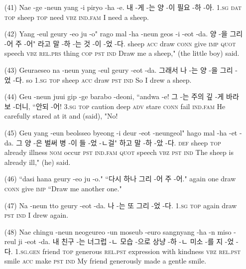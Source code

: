 \begin{itemize}
\item [(41)]
\tgl
		{Nae -ge -neun yang -i piryo -ha -e.}
		{내 -게 -는 양 -이 필요 -하 -아.}
		{\textsc{1.sg}	\textsc{dat}	\textsc{top}	sheep	\textsc{top}	need	\textsc{vbz}	\textsc{ind.fam}}
		{I need a sheep.}

\item [(42)]
\tgl
		{Yang -eul geury -eo ju -o" rago mal -ha -neun geos -i -eot -da.}
		{양 -을 그리 -어 주 -어" 라고 말 -하 -는 것 -이 -었 -다.}
		{sheep	\textsc{acc}	draw	\textsc{conn}	give	\textsc{imp}	\textsc{quot}	speech	\textsc{vbz}	\textsc{rel.prs}	thing	\textsc{cop}	\textsc{pst}	\textsc{ind}}
		{Draw me a sheep," (the little boy) said.}
		
\item [(43)]
\tgl
		{Geuraeseo na -neun yang -eul geury -eot -da.}
		{그래서 나 -는 양 -을 그리 -었 -다.}
		{so	\textsc{1.sg}	\textsc{top}	sheep	\textsc{acc}	draw	\textsc{pst}	\textsc{ind}}
		{So I drew a sheep.}
		
\item [(44)]
\tgl
		{Geu -neun juui gip -ge barabo -deoni, ``andwa -e!}
		{그 -는 주의 깊 -게 바라보 -더니, ``안되 -어!}
		{\textsc{3.sg}	\textsc{top}	caution	deep	\textsc{adv}	stare	\textsc{conn}	fail	\textsc{ind.fam}}
		{He carefully stared at it and (said), "No!}

\item [(45)]
\tgl
		{Geu yang -eun beolsseo byeong -i deur -eot -neungeol" hago mal -ha -et -da.}
		{그 양 -은 벌써 병 -이 들 -었 -ㄴ걸" 하고 말 -하 -았 -다.}
		{\textsc{def}	sheep	\textsc{top}	already	illness	\textsc{nom}	occur	\textsc{pst}	\textsc{ind.fam}	\textsc{quot}	speech	\textsc{vbz}	\textsc{pst}	\textsc{ind}}
		{The sheep is already ill," (he) said.}
		
\item [(46)]
\tgl
		{``dasi hana geury -eo ju -o."}
		{``다시 하나 그리 -어 주 -어."}
		{again	one	draw	\textsc{conn}	give	\textsc{imp}}
		{``Draw me another one."}

\item [(47)]
\tgl
		{Na -neun tto geury -eot -da.}
		{나 -는 또 그리 -었 -다.}
		{\textsc{1.sg}	\textsc{top}	again	draw	\textsc{pst}	\textsc{ind}}
		{I drew again.}

\item [(48)]
\tgl
		{Nae chingu -neun neogeureo -un moseub -euro sangnyang -ha -n miso -reul ji -eot -da.}
		{내 친구 -는 너그럽 -ㄴ 모습 -으로 상냥 -하 -ㄴ 미소 -를 지 -었 -다.}
		{\textsc{1.sg.gen}	friend	\textsc{top}	generous	\textsc{rel.pst}	expression	with	kindness	\textsc{vbz}	\textsc{rel.pst}	smile	\textsc{acc}	make	\textsc{pst}	\textsc{ind}}
		{My friend generously made a gentle smile.}


\end{itemize}
